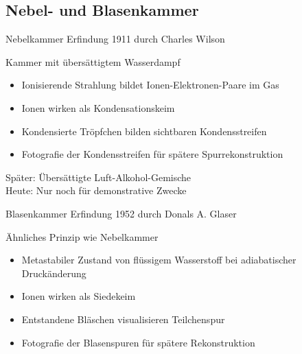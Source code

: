 \subsection{Nebel- und Blasenkammer}


\begin{frame}{Nebelkammer}
	Erfindung 1911 durch Charles Wilson
	\begin{block}{Kammer mit übersättigtem Wasserdampf}
		\begin{itemize}
		  \item Ionisierende Strahlung bildet Ionen-Elektronen-Paare im Gas
		  \item Ionen wirken als Kondensationskeim
		  \item Kondensierte Tröpfchen bilden sichtbaren Kondensstreifen 
		  \item Fotografie der Kondensstreifen für spätere Spurrekonstruktion
		\end{itemize}
	\end{block}
	Später: Übersättigte Luft-Alkohol-Gemische\\
	Heute: Nur noch für demonstrative Zwecke
\end{frame}


\begin{frame}{Blasenkammer}
	Erfindung 1952 durch Donals A. Glaser
	\begin{block}{Ähnliches Prinzip wie Nebelkammer}
		\begin{itemize}
		  \item Metastabiler Zustand von flüssigem Wasserstoff bei adiabatischer
		  Druckänderung
		  \item Ionen wirken als Siedekeim
		  \item Entstandene Bläschen visualisieren Teilchenspur 
		  \item Fotografie der Blasenspuren für spätere Rekonstruktion
		\end{itemize}
	\end{block}
\end{frame}


